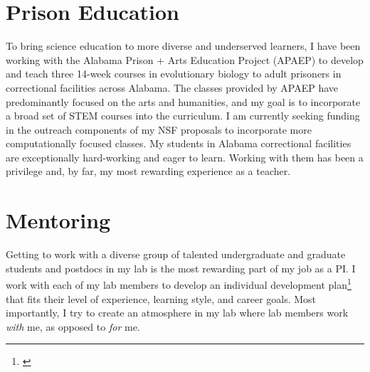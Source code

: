 \section*{Prison Education}
To bring science education to more diverse and underserved learners,
I have been working with
the Alabama Prison + Arts Education Project (APAEP) to develop and teach three
14-week courses in evolutionary biology to adult prisoners in correctional
facilities across Alabama.
The classes provided by APAEP have predominantly focused on the
arts and humanities, and
my
goal is to incorporate a broad set of STEM courses into the
curriculum.
I am currently seeking funding in the outreach components of my
NSF proposals
to incorporate more computationally focused classes.
My students in Alabama correctional facilities are exceptionally hard-working
and eager to learn.
Working with them has been a privilege and, by far, my most rewarding
experience as a teacher.

\section*{Mentoring}
Getting to work with a diverse group of talented undergraduate and graduate
students and postdocs in my lab is the most rewarding part of my job as a
PI.
I work with each of my lab members to develop an individual development
plan\footnote{\label{idp}} that fits
their level of experience, learning style, and career goals.
Most importantly, I try to create an atmosphere in my lab where
lab members work \emph{with} me, as opposed to \emph{for} me.

